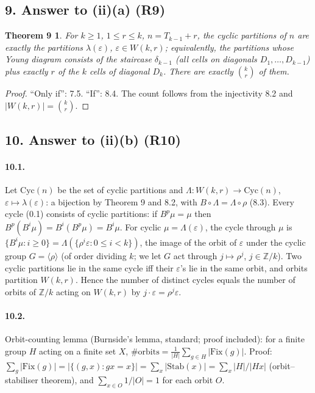 \documentclass[11pt]{article}
\newtheorem*{theoremnine}{Theorem 9}
\begin{document}
\subsection*{9. Answer to (ii)(a) (R9)}

\begin{theoremnine}
For $k\ge1$, $1\le r\le k$, $n=T_{k-1}+r$, the cyclic partitions of $n$ are exactly the partitions
$\lambda(\varepsilon)$, $\varepsilon\in W(k,r)$; equivalently, the partitions whose Young diagram consists of the
staircase $\delta_{k-1}$ (all cells on diagonals $D_1,\ldots,D_{k-1}$) plus exactly $r$ of the $k$ cells of
diagonal $D_k$. There are exactly $\binom kr$ of them.
\end{theoremnine}

\begin{proof}
``Only if'': 7.5. ``If'': 8.4. The count follows from the injectivity 8.2 and $|W(k,r)|=\binom kr$.
\end{proof}

\subsection*{10. Answer to (ii)(b) (R10)}

\paragraph{10.1.} Let $\mathrm{Cyc}(n)$ be the set of cyclic partitions and
$\Lambda:W(k,r)\to\mathrm{Cyc}(n)$, $\varepsilon\mapsto\lambda(\varepsilon)$: a bijection by Theorem 9 and 8.2,
with $B\circ\Lambda=\Lambda\circ\rho$ (8.3). Every cycle (0.1) consists of cyclic partitions: if $B^p\mu=\mu$
then $B^p(B^i\mu)=B^i(B^p\mu)=B^i\mu$. For cyclic $\mu=\Lambda(\varepsilon)$, the cycle through $\mu$ is
$\{B^i\mu:i\ge0\}=\Lambda(\{\rho^i\varepsilon:0\le i<k\})$, the image of the orbit of $\varepsilon$ under the cyclic
group $G=\langle\rho\rangle$ (of order dividing $k$; we let $G$ act through $j\mapsto\rho^j$, $j\in\mathbb Z/k$).
Two cyclic partitions lie in the same cycle iff their $\varepsilon$'s lie in the same orbit, and orbits partition
$W(k,r)$. Hence the number of distinct cycles equals the number of orbits of $\mathbb Z/k$ acting on $W(k,r)$ by
$j\cdot\varepsilon=\rho^j\varepsilon$.

\paragraph{10.2.} Orbit-counting lemma (Burnside's lemma, standard; proof included): for a finite group $H$ acting
on a finite set $X$, $\#\text{orbits}=\frac1{|H|}\sum_{g\in H}|\mathrm{Fix}(g)|$. Proof:
$\sum_g|\mathrm{Fix}(g)|=|\{(g,x):gx=x\}|=\sum_x|\mathrm{Stab}(x)|=\sum_x|H|/|Hx|$ (orbit--stabiliser theorem), and
$\sum_{x\in O}1/|O|=1$ for each orbit $O$.
\end{document}
